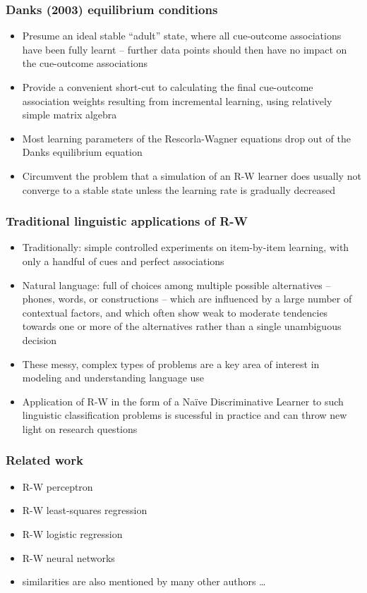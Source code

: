 \documentclass[t]{beamer} %
\begin{document}
\begin{frame}
  \frametitle{Danks (2003) equilibrium conditions} 

  \begin{itemize}
  \item Presume an ideal stable ``adult'' state, where all cue-outcome
    associations have been fully learnt -- further data points should then
    have no impact on the cue-outcome associations
  \item Provide a convenient short-cut to calculating the final cue-outcome
    association weights resulting from incremental learning, using relatively
    simple matrix algebra
  \item Most learning parameters of the Rescorla-Wagner equations drop
    out of the Danks equilibrium equation
  \item Circumvent the problem that a simulation of an R-W learner does
    usually not converge to a stable state unless the learning rate is
    gradually decreased
  \end{itemize}
\end{frame}

\begin{frame}
  \frametitle{Traditional \vs linguistic applications of R-W}

  \begin{itemize}
  \item Traditionally: simple controlled experiments on item-by-item
    learning, with only a handful of cues and perfect associations
  \item Natural language: full of choices among multiple possible alternatives
    -- phones, words, or constructions -- which are influenced by a large
    number of contextual factors, and which often show weak to moderate 
    tendencies towards one or more of the alternatives rather than a
    single unambiguous decision
  \item These messy, complex types of problems are a key area of interest in
    modeling and understanding language use
  \item Application of R-W in the form of a Naïve Discriminative Learner to
    such linguistic classification problems is sucessful in practice and can 
    throw new light on research questions
  \end{itemize}
\end{frame}

\begin{frame}
  \frametitle{Related work}

  \begin{itemize}
  \item R-W \vs perceptron \citep[p.~155f]{Sutton:Barto:81}
  \item R-W \vs least-squares regression \citep[p.~457]{Stone:86}
  \item R-W \vs logistic regression \citep[p.~234]{Gluck:Bower:88}
  \item R-W \vs neural networks \citep{Dawson:08}
  \item[\hand] similarities are also mentioned by many other authors \ldots
  \end{itemize}
\end{frame}
\end{document}
